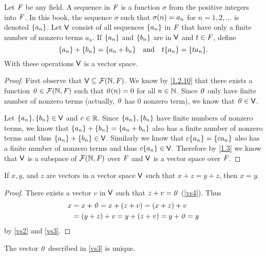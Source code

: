 \begin{eg}\label{1.2.13}
	Let \(\mathit{F}\) be any field.
	A sequence in \(\mathit{F}\) is a function \(\sigma\) from the positive integers into \(\mathit{F}\).
	In this book, the sequence \(\sigma\) such that \(\sigma\p{n} = a_{n}\) for \(n = 1, 2, \dots\) is denoted \(\left\lbrace a_{n}\right\rbrace\).
	Let \(\mathsf{V}\) consist of all sequences \(\left\lbrace a_{n}\right\rbrace\) in \(\mathit{F}\) that have only a finite number of nonzero terms \(a_{n}\).
	If \(\left\lbrace a_{n}\right\rbrace\) and \(\left\lbrace b_{n}\right\rbrace\) are in \(\mathsf{V}\) and \(t \in \mathit{F}\), define
	\[
		\set{a_{n}} + \set{b_{n}} = \set{a_{n} + b_{n}} \quad \text{and} \quad t\set{a_{n}} = \set{ta_{n}}.
	\]
	With these operations \(\mathsf{V}\) is a vector space.
\end{eg}

\begin{proof}
	First observe that \(\V \subseteq \fs{\N}{\F}\).
	We know by \cref{1.2.10} that there exists a function \(\zv \in \fs{\N}{\F}\) such that \(\mathit{0}(n) = 0\) for all \(n \in \mathbb{N}\).
	Since \(\mathit{0}\) only have finite number of nonzero terms (actually, \(\mathit{0}\) has \(0\) nonzero term), we know that \(\mathit{0} \in \mathsf{V}\).

	Let \(\B{a_{n}}, \B{b_{n}} \in \V\) and \(c \in \mathbb{R}\).
	Since \(\B{a_{n}}, \B{b_{n}}\) have finite numbers of nonzero terms, we know that \(\left\lbrace a_{n}\right\rbrace + \left\lbrace b_{n}\right\rbrace = \left\lbrace a_{n} + b_{n}\right\rbrace\) also has a finite number of nonzero terms and thus \(\left\lbrace a_{n}\right\rbrace + \left\lbrace b_{n}\right\rbrace \in \mathsf{V}\).
	Similarly we know that \(c\B{a_{n}} = \B{ca_{n}}\) also has a finite number of nonzero terms and thus \(c\B{a_{n}} \in \V\).
	Therefore by \cref{1.3} we know that \(\mathsf{V}\) is a subspace of \(\fs{\N}{\F}\) over \(\mathit{F}\) and \(\mathsf{V}\) is a vector space over \(\mathit{F}\).
\end{proof}

\begin{thm}\label{1.1}
	If \(x, y\), and \(z\) are vectors in a vector space \(\mathsf{V}\) such that \(x + z = y + z\), then \(x = y\).
\end{thm}

\begin{proof}
	There exists a vector \(v\) in \(\mathsf{V}\) such that \(z + v = \mathit{0}\) (\ref{vs4}).
	Thus
	\begin{align*}
		x & = x + \mathit{0} = x + \left\lparen z + v\right\rparen = \left\lparen x + z\right\rparen + v     \\
		  & = \left\lparen y + z\right\rparen + v = y + \left\lparen z + v\right\rparen = y + \mathit{0} = y
	\end{align*}
	by \ref{vs2} and \ref{vs3}.
\end{proof}

\begin{cor}\label{1.2.14}
	The vector \(\mathit{0}\) described in \ref{vs3} is unique.
\end{cor}


